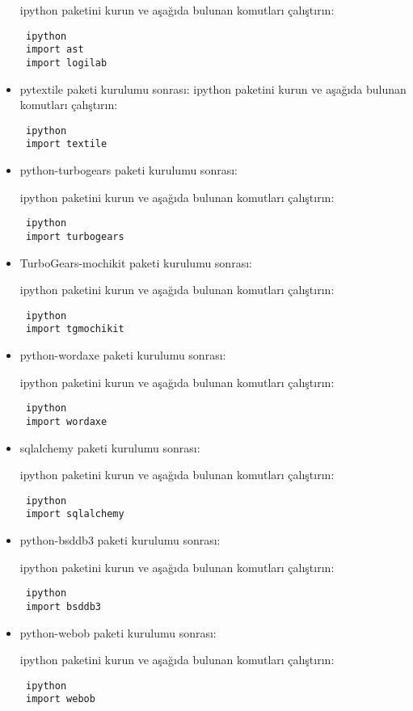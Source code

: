 \documentclass[a4paper,10pt]{article}
\begin{document}
\begin{itemize}
ipython paketini kurun ve aşağıda bulunan komutları çalıştırın:
\begin{verbatim}
 ipython
 import ast
 import logilab
\end{verbatim}


\item pytextile  paketi kurulumu sonrası:
ipython paketini kurun ve aşağıda bulunan komutları çalıştırın:
\begin{verbatim}
 ipython
 import textile
\end{verbatim}

\item python-turbogears  paketi kurulumu sonrası:

ipython paketini kurun ve aşağıda bulunan komutları çalıştırın:
\begin{verbatim}
 ipython
 import turbogears
\end{verbatim}

\item TurboGears-mochikit  paketi kurulumu sonrası:

ipython paketini kurun ve aşağıda bulunan komutları çalıştırın:
\begin{verbatim}
 ipython
 import tgmochikit
\end{verbatim}


\item python-wordaxe paketi kurulumu sonrası:

ipython paketini kurun ve aşağıda bulunan komutları çalıştırın:
\begin{verbatim}
 ipython
 import wordaxe
\end{verbatim}


\item sqlalchemy paketi kurulumu sonrası:

ipython paketini kurun ve aşağıda bulunan komutları çalıştırın:
\begin{verbatim}
 ipython
 import sqlalchemy
\end{verbatim}


\item python-bsddb3 paketi kurulumu sonrası:

ipython paketini kurun ve aşağıda bulunan komutları çalıştırın:
\begin{verbatim}
 ipython
 import bsddb3
\end{verbatim}

\item python-webob paketi kurulumu sonrası:

ipython paketini kurun ve aşağıda bulunan komutları çalıştırın:
\begin{verbatim}
 ipython
 import webob
\end{verbatim}


\end{itemize}
\end{document}
